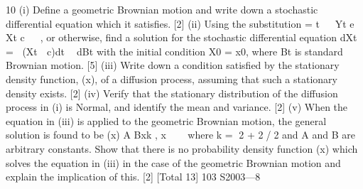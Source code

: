 10 (i) Define a geometric Brownian motion and write down a stochastic differential
equation which it satisfies. [2]
(ii) Using the substitution = t  
Yt e Xt c 
 , or otherwise, find a solution for the
stochastic differential equation
dXt = (Xt  c)dt  dBt
with the initial condition X0 = x0, where Bt is standard Brownian motion. [5]
(iii) Write down a condition satisfied by the stationary density function, 
(x), of a
diffusion process, assuming that such a stationary density exists. [2]
(iv) Verify that the stationary distribution of the diffusion process in (i) is Normal,
and identify the mean and variance. [2]
(v) When the equation in (iii) is applied to the geometric Brownian motion, the
general solution is found to be
(x) A Bxk ,
x   
where k = 2 + 2/2 and A and B are arbitrary constants. Show that there is
no probability density function 
(x) which solves the equation in (iii) in the
case of the geometric Brownian motion and explain the implication of this. [2]
[Total 13]
103 S2003—8


